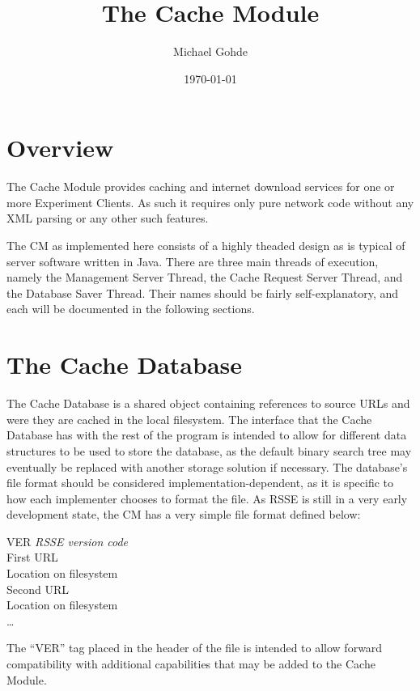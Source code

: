\documentclass[letterpaper]{article}
\begin{document}
\title{The Cache Module}
\author{Michael Gohde}
\date{\today}
\maketitle

\section{Overview}
The Cache Module provides caching and internet download services for one or more Experiment Clients. As such it requires only pure network code without any XML parsing or any other such features.

The CM as implemented here consists of a highly theaded design as is typical of server software written in Java. There are three main threads of execution, namely the Management Server Thread, the Cache Request Server Thread, and the Database Saver Thread. Their names should be fairly self-explanatory, and each will be documented in the following sections.

\section{The Cache Database}
The Cache Database is a shared object containing references to source URLs and were they are cached in the local filesystem. The interface that the Cache Database has with the rest of the program is intended to allow for different data structures to be used to store the database, as the default binary search tree may eventually be replaced with another storage solution if necessary. The database's file format should be considered implementation-dependent, as it is specific to how each implementer chooses to format the file. As RSSE is still in a very early development state, the CM has a very simple file format defined below:
\\
\begin{addmargin}[1em]{2em}
VER \textit{RSSE version code}\\
First URL\\
Location on filesystem\\
Second URL\\
Location on filesystem\\
\ldots\\
\end{addmargin}

The ``VER'' tag placed in the header of the file is intended to allow forward compatibility with additional capabilities that may be added to the Cache Module.
\end{document}
